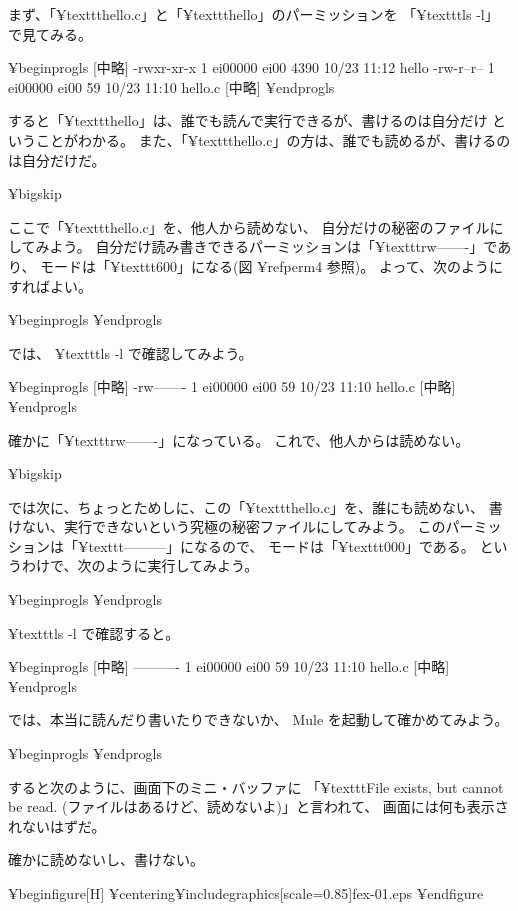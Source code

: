 まず、「¥texttt{hello.c}」と「¥texttt{hello}」のパーミッションを
「¥texttt{ls -l}」で見てみる。

¥begin{progls}
 [中略]
-rwxr-xr-x  1 ei00000  ei00  4390  10/23 11:12  hello
-rw-r--r--  1 ei00000  ei00    59  10/23 11:10  hello.c
 [中略]
%
¥end{progls}

すると「¥texttt{hello}」は、誰でも読んで実行できるが、書けるのは自分だけ
ということがわかる。
また、「¥texttt{hello.c}」の方は、誰でも読めるが、書けるのは自分だけだ。

¥bigskip

ここで「¥texttt{hello.c}」を、他人から読めない、
自分だけの秘密のファイルにしてみよう。
自分だけ読み書きできるパーミッションは「¥texttt{rw-------}」であり、
モードは「¥texttt{600}」になる(図 ¥ref{perm4} 参照)。
よって、次のようにすればよい。

¥begin{progls}
%
¥end{progls}

では、 ¥texttt{ls -l} で確認してみよう。

¥begin{progls}
 [中略]
-rw-------  1 ei00000  ei00    59  10/23 11:10  hello.c
 [中略]
%
¥end{progls}

確かに「¥texttt{rw-------}」になっている。
これで、他人からは読めない。

¥bigskip

では次に、ちょっとためしに、この「¥texttt{hello.c}」を、誰にも読めない、
書けない、実行できないという究極の秘密ファイルにしてみよう。
このパーミッションは「¥texttt{---------}」になるので、
モードは「¥texttt{000}」である。
というわけで、次のように実行してみよう。

¥begin{progls}
%
¥end{progls}

 ¥texttt{ls -l} で確認すると。

¥begin{progls}
 [中略]
----------  1 ei00000  ei00    59  10/23 11:10  hello.c
 [中略]
%
¥end{progls}

では、本当に読んだり書いたりできないか、 Mule を起動して確かめてみよう。

¥begin{progls}
%
¥end{progls}

すると次のように、画面下のミニ・バッファに
「¥texttt{File exists, but cannot be read.}
(ファイルはあるけど、読めないよ)」と言われて、
画面には何も表示されないはずだ。

確かに読めないし、書けない。

¥begin{figure}[H]
¥centering{¥includegraphics[scale=0.85]{fex-01.eps}}
¥end{figure}

